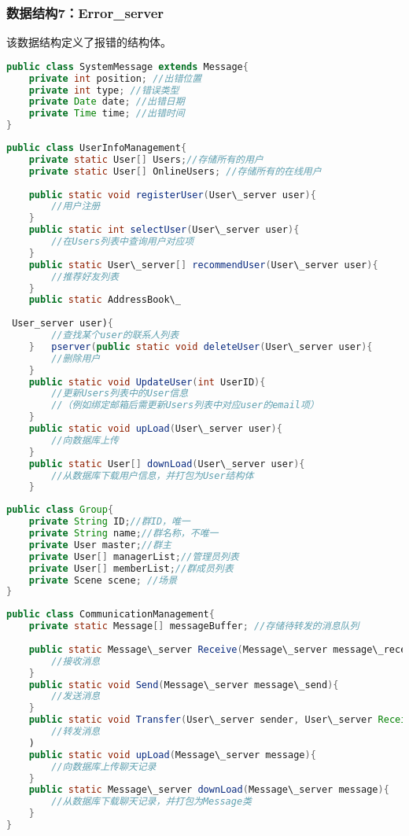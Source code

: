 \subsubsection{数据结构7：Error\_server}
该数据结构定义了报错的结构体。
\begin{lstlisting}[language=Java, caption=Error定义]
public class SystemMessage extends Message{
    private int position; //出错位置
    private int type; //错误类型
    private Date date; //出错日期
    private Time time; //出错时间
}
\end{lstlisting}


\begin{lstlisting}[language=Java, caption=用户信息管理类]
public class UserInfoManagement{
    private static User[] Users;//存储所有的用户
    private static User[] OnlineUsers; //存储所有的在线用户
    
    public static void registerUser(User\_server user){
        //用户注册
    }
    public static int selectUser(User\_server user){
        //在Users列表中查询用户对应项
    }
    public static User\_server[] recommendUser(User\_server user){
        //推荐好友列表
    }
    public static AddressBook\_
    
 User_server user){
        //查找某个user的联系人列表
    }   pserver(public static void deleteUser(User\_server user){
        //删除用户
    }
    public static void UpdateUser(int UserID){
        //更新Users列表中的User信息
        //（例如绑定邮箱后需更新Users列表中对应user的email项）
    }
    public static void upLoad(User\_server user){
        //向数据库上传
    }
    public static User[] downLoad(User\_server user){
        //从数据库下载用户信息，并打包为User结构体
    }
\end{lstlisting}

\begin{lstlisting}[language=Java, caption=Group定义]
public class Group{
    private String ID;//群ID，唯一
    private String name;//群名称，不唯一
    private User master;//群主
    private User[] managerList;//管理员列表
    private User[] memberList;//群成员列表
    private Scene scene; //场景
}
\end{lstlisting}

\begin{lstlisting}[language=Java, caption=通讯管理类]
public class CommunicationManagement{
    private static Message[] messageBuffer; //存储待转发的消息队列
    
    public static Message\_server Receive(Message\_server message\_received){
        //接收消息
    }
    public static void Send(Message\_server message\_send){
        //发送消息
    }
    public static void Transfer(User\_server sender, User\_server Receiver){
        //转发消息
    )
    public static void upLoad(Message\_server message){
        //向数据库上传聊天记录
    }
    public static Message\_server downLoad(Message\_server message){
        //从数据库下载聊天记录，并打包为Message类
    }
}
\end{lstlisting}

